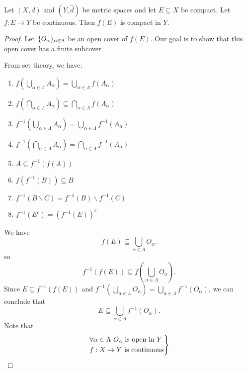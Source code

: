 \begin{theorem} \leavevmode \\
    \label{thm4.14}
    Let $(X,d)$ and $(Y, \overset{\sim}{d})$ be metric spaces and let $E\subseteq X$ be compact. Let $f:E\to Y$ be continuous. Then $f(E)$ is compact in $Y$.
\end{theorem}

\begin{proof}
    Let $\ocover{O}$ be an open cover of $f(E)$. Our goal is to show that this open cover has a finite subcover.
    \begin{recall}
    From set theory, we have:
    \begin{enumerate}[$(1)$]
        \item $f \left(\bigcup \limits_{\alpha \in \Lambda}A_{\alpha}\right) = \bigcup \limits_{\alpha \in \Lambda} f(A_{\alpha})$
        \item $f \left(\bigcap \limits_{\alpha \in \Lambda} A_{\alpha}\right) \subseteq \bigcap \limits_{\alpha \in \Lambda}f(A_{\alpha})$
        \item $f^{-1}\left(\bigcup \limits_{\alpha \in \Lambda} A_{\alpha}\right) = \bigcup \limits_{\alpha \in \Lambda} f^{-1}(A_{\alpha})$
        \item $f^{-1}\left(\bigcap \limits_{\alpha \in \Lambda} A_{\alpha}\right) = \bigcap \limits_{\alpha \in \Lambda} f^{-1}(A_{\alpha})$
        \item $A\subseteq f^{-1}(f(A))$
        \item $f(f^{-1}(B)) \subseteq B$
        \item $f^{-1}(B \backslash C) = f^{-1}(B) \backslash f^{-1}(C)$
        \item $f^{-1}(E^c)=\left(f^{-1}(E)\right)^c$
    \end{enumerate}
    \end{recall}
    We have
    $$f(E) \subseteq \bigcup \limits_{\alpha \in \Lambda} O_{\alpha}.$$
    so
    $$f^{-1}(f(E)) \subseteq f\left(\bigcup \limits_{\alpha \in \Lambda} O_{\alpha}\right).$$
    Since $E \subseteq f^{-1}(f(E))$ and $f^{-1}\left(\bigcup \limits_{\alpha \in \Lambda}O_{\alpha}\right) = \bigcup \limits_{\alpha \in \Lambda}f^{-1}(O_{\alpha})$, we can conclude that 
    $$E \subseteq \bigcup \limits_{\alpha \in \Lambda}f^{-1}(O_{\alpha}).$$
    Note that
    $$\begin{rcases*}
        \forall \alpha \in \Lambda ~O_{\alpha} \text{ is open in $Y$} \\
        f: X \to Y \text{ is continuous}

\end{rcases*}$$
\end{proof}
